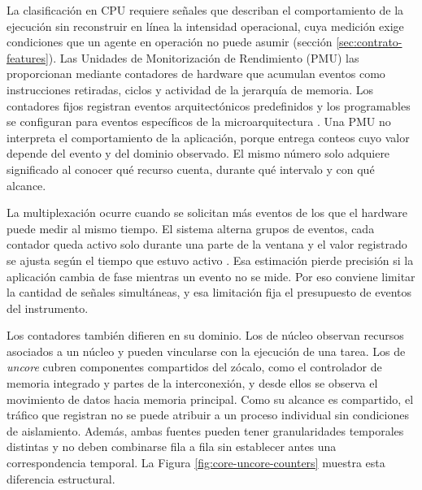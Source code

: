 La clasificación en CPU requiere señales que describan el comportamiento de la ejecución sin reconstruir en línea la intensidad operacional, cuya medición exige condiciones que un agente en operación no puede asumir (sección \ref{sec:contrato-features}). Las Unidades de Monitorización de Rendimiento (PMU) las proporcionan mediante contadores de hardware que acumulan eventos como instrucciones retiradas, ciclos y actividad de la jerarquía de memoria. Los contadores fijos registran eventos arquitectónicos predefinidos y los programables se configuran para eventos específicos de la microarquitectura \cite{Weaver2015,IntelSDM2026}. Una PMU no interpreta el comportamiento de la aplicación, porque entrega conteos cuyo valor depende del evento y del dominio observado. El mismo número solo adquiere significado al conocer qué recurso cuenta, durante qué intervalo y con qué alcance.

La multiplexación ocurre cuando se solicitan más eventos de los que el hardware puede medir al mismo tiempo. El sistema alterna grupos de eventos, cada contador queda activo solo durante una parte de la ventana y el valor registrado se ajusta según el tiempo que estuvo activo \cite{Liu2024,LinuxPerfEventOpen2026}. Esa estimación pierde precisión si la aplicación cambia de fase mientras un evento no se mide. Por eso conviene limitar la cantidad de señales simultáneas, y esa limitación fija el presupuesto de eventos del instrumento.

Los contadores también difieren en su dominio. Los de núcleo observan recursos asociados a un núcleo y pueden vincularse con la ejecución de una tarea. Los de \textit{uncore} cubren componentes compartidos del zócalo, como el controlador de memoria integrado y partes de la interconexión, y desde ellos se observa el movimiento de datos hacia memoria principal. Como su alcance es compartido, el tráfico que registran no se puede atribuir a un proceso individual sin condiciones de aislamiento. Además, ambas fuentes pueden tener granularidades temporales distintas y no deben combinarse fila a fila sin establecer antes una correspondencia temporal. La Figura \ref{fig:core-uncore-counters} muestra esta diferencia estructural.

